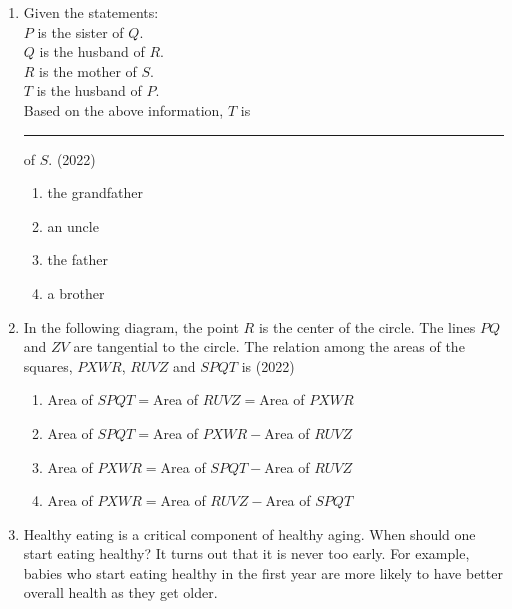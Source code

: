 \documentclass[journal]{IEEEtran}
\begin{document}
\begin{enumerate}
\item Given the statements:\\
$P$ is the sister of $Q$.\\
$Q$ is the husband of $R$.\\
$R$ is the mother of $S$.\\
$T$ is the husband of $P$.\\

Based on the above information, $T$ is \rule{1cm}{0.15mm} of $S$. \hfill(2022)
\begin{multicols}{2}
\begin{enumerate}
\item the grandfather
\item an uncle
\item the father
\item a brother
\end{enumerate}
\end{multicols}


\item In the following diagram, the point $R$ is the center of the circle. The lines $PQ$ and $ZV$ are tangential to the circle. The relation among the areas of the squares, $PXWR$, $RUVZ$ and $SPQT$ is \hfill(2022)


\begin{enumerate}
\item Area of $SPQT=$Area of $RUVZ=$Area of $PXWR$
\item Area of $SPQT=$Area of $PXWR-$Area of $RUVZ$
\item Area of $PXWR=$Area of $SPQT-$Area of $RUVZ$
\item Area of $PXWR=$Area of $RUVZ-$Area of $SPQT$
\end{enumerate}


\item Healthy eating is a critical component of healthy aging. When should one start eating healthy? It turns out that it is never too early. For example, babies who start eating healthy in the first year are more likely to have better overall health as they get older.


\end{enumerate}
\end{document}

